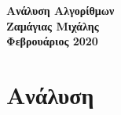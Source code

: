 \documentclass[a4paper,12pt]{article}
\begin{document}
\begin{titlepage}
    \begin{center}
        \vspace*{\fill}
        \huge\textbf{Ανάλυση Αλγορίθμων\\}
        \vspace*{\fill}
        \vfill
        \normalsize\textbf{Ζαμάγιας Μιχάλης\\}
        \small\textbf{Φεβρουάριος 2020\\}
        \vfill
    \end{center}
\end{titlepage}

\tableofcontents


\newpage
\section{Ανάλυση}
\end{document}
